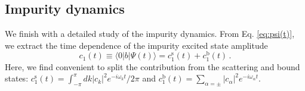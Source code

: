 \documentclass[aps,pra,twocolumn,floatfix,superscriptaddress]{revtex4-1}%
\begin{document}


\subsection{Impurity dynamics}

{\color{blue}We finish with a detailed study of the impurity dynamics. From Eq. \eqref{eq:psi(t)}, we extract the time dependence of the impurity excited state amplitude}
\begin{equation}
\label{eq:qubit_amplitude}
c_1(t) \equiv
\langle 0|b|\Psi(t)\rangle 
 =
c_1^\text{s}(t) + 
c_1^\text{b}(t) \, .
\end{equation}
{\color{blue}Here, we find convenient to split the contribution from the scattering and bound states: $c_1^\text{s}(t) = \int_{-\pi}^\pi dk |c_k|^2 e^{-i\omega_k t}/2\pi$ and $c_1^\text{b}(t) = \sum_{\alpha=\pm}|c_\alpha|^2 e^{-i\omega_\alpha t}$.}

\end{document}
